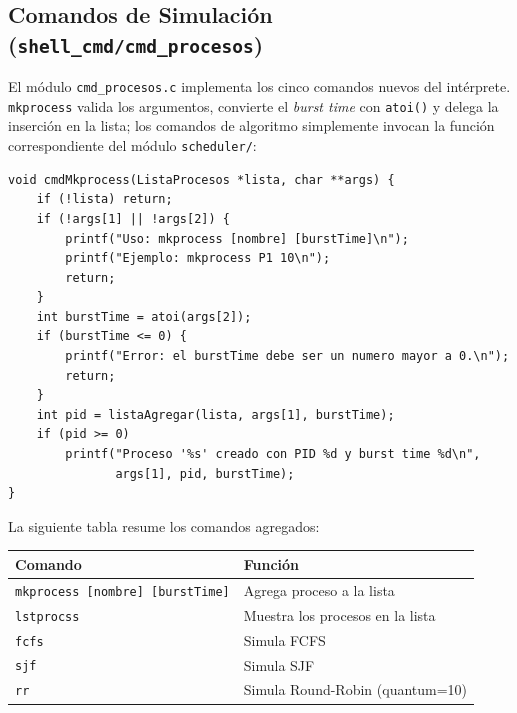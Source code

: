 \documentclass[12pt]{article}
\begin{document}
    \subsection{Comandos de Simulación (\texttt{shell\_cmd/cmd\_procesos})}
    El módulo \texttt{cmd\_procesos.c} implementa los cinco comandos nuevos del intérprete. \texttt{mkprocess} valida los argumentos, convierte el \textit{burst time} con \texttt{atoi()} y delega la inserción en la lista; los comandos de algoritmo simplemente invocan la función correspondiente del módulo \texttt{scheduler/}:
    \begin{lstlisting}[caption={Implementacion del comando mkprocess en cmd_procesos.c.}]
void cmdMkprocess(ListaProcesos *lista, char **args) {
    if (!lista) return;
    if (!args[1] || !args[2]) {
        printf("Uso: mkprocess [nombre] [burstTime]\n");
        printf("Ejemplo: mkprocess P1 10\n");
        return;
    }
    int burstTime = atoi(args[2]);
    if (burstTime <= 0) {
        printf("Error: el burstTime debe ser un numero mayor a 0.\n");
        return;
    }
    int pid = listaAgregar(lista, args[1], burstTime);
    if (pid >= 0)
        printf("Proceso '%s' creado con PID %d y burst time %d\n",
               args[1], pid, burstTime);
}
    \end{lstlisting}
    La siguiente tabla resume los comandos agregados:
    \begin{center}
    \begin{tabular}{|l|l|}
        \hline
        \textbf{Comando} & \textbf{Función} \\
        \hline
        \texttt{mkprocess [nombre] [burstTime]} & Agrega proceso a la lista \\
        \texttt{lstprocss} & Muestra los procesos en la lista \\
        \texttt{fcfs} & Simula FCFS \\
        \texttt{sjf} & Simula SJF \\
        \texttt{rr} & Simula Round-Robin (quantum=10) \\
        \hline
    \end{tabular}
    \end{center}
\end{document}

